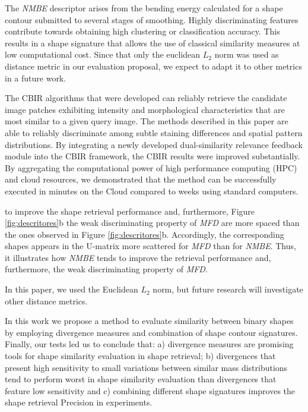 The \emph{NMBE} descriptor arises from the bending energy calculated for a shape contour submitted to several stages of smoothing.  Highly discriminating features contribute towards obtaining high clustering or classification accuracy.\color{black} 
This results in a shape signature that allows the use of classical similarity measures at low computational cost.
Since that only the euclidean $L_2$ norm was used as distance metric in our evaluation proposal, we expect to adapt it to other metrics in a future work. 

The CBIR algorithms that were developed can reliably retrieve the candidate image patches exhibiting intensity and morphological characteristics that are most similar to a given query image. The methods described in this paper are able to reliably discriminate among subtle staining differences and spatial pattern distributions. By integrating a newly developed dual-similarity relevance feedback module into the CBIR framework, the CBIR results were improved substantially. By aggregating the computational power of high performance computing (HPC) and cloud resources, we demonstrated that the method can be successfully executed in minutes on the Cloud compared to weeks using standard computers. 

to improve the shape retrieval performance and, furthermore, Figure \ref{fig:descritores}b the weak discriminating property of \emph{MFD}
are more spaced than the ones observed in Figure \ref{fig:descritores}b. Accordingly, the corresponding shapes appears in the U-matrix more scattered for \emph{MFD} than for \emph{NMBE}. Thus, it illustrates how \emph{NMBE} tends to improve the retrieval performance and, furthermore, the weak discriminating property of \emph{MFD}.


In this paper, we used the Euclidean $L_2$ norm, but future research will investigate other distance metrics. 

In this work we propose a method to evaluate similarity between binary shapes by employing divergence measures and combination of shape contour signatures. Finally, our tests led us to conclude that:  a) divergence measures are promising tools for shape similarity evaluation in shape retrieval; b) divergences that present high sensitivity to small variations between similar mass distributions tend to perform worst in shape similarity evaluation than divergences that feature low sensitivity and c) combining different shape signatures improves the shape retrieval Precision in experiments. 

